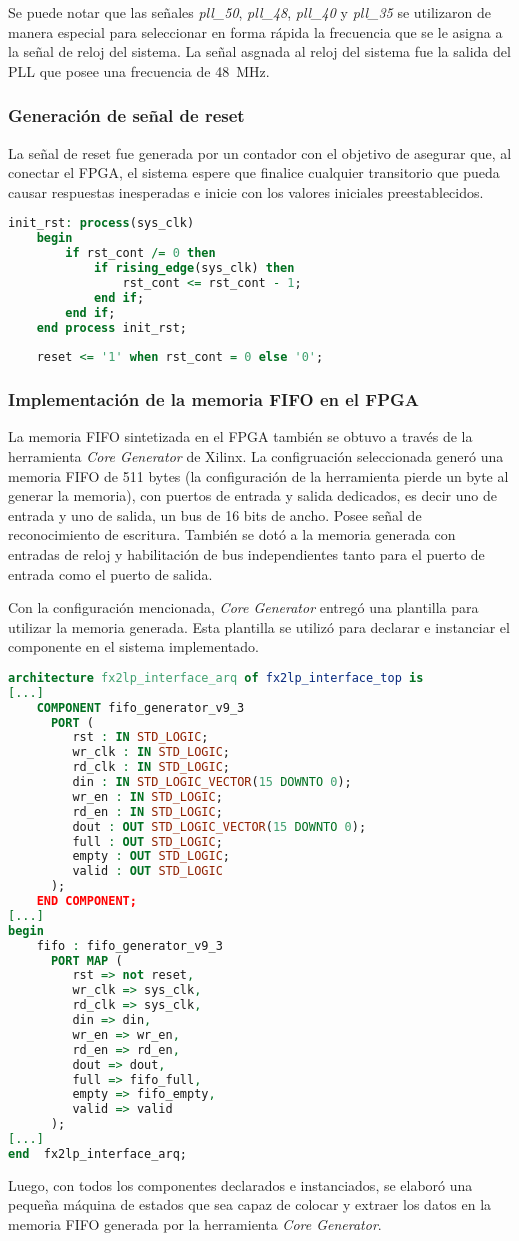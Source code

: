 		Se puede notar que las señales {\it pll\_50}, {\it pll\_48}, {\it pll\_40} y {\it pll\_35} se utilizaron de manera especial para seleccionar en forma rápida la frecuencia que se le asigna a la señal de reloj del sistema. La señal asgnada al reloj del sistema fue la salida del PLL que posee una frecuencia de \SI{48}{\mega\hertz}.
		
	\subsubsection{Generación de señal de reset}
		La señal de reset fue generada por un contador con el objetivo de asegurar que, al conectar el FPGA, el sistema espere que finalice cualquier transitorio que pueda causar respuestas inesperadas e inicie con los valores iniciales preestablecidos.

		\begin{lstlisting}[language=VHDL,backgroundcolor=\color{gray!30}]
	init_rst: process(sys_clk)
	begin
		if rst_cont /= 0 then
			if rising_edge(sys_clk) then
				rst_cont <= rst_cont - 1;
			end if;
		end if;
	end process init_rst;
	
	reset <= '1' when rst_cont = 0 else '0';
		\end{lstlisting}
		
	\subsubsection{Implementación de la memoria FIFO en el FPGA}
		La memoria FIFO sintetizada en el FPGA también se obtuvo a través de la herramienta {\it Core Generator} de Xilinx. La configruación seleccionada generó una memoria FIFO de 511 bytes (la configuración de la herramienta pierde un byte al generar la memoria), con puertos de entrada y salida dedicados, es decir uno de entrada y uno de salida, un bus de 16 bits de ancho. Posee señal de reconocimiento de escritura. También se dotó a la memoria generada con entradas de reloj y habilitación de bus independientes tanto para el puerto de entrada como el puerto de salida.
		
		Con la configuración mencionada, {\it Core Generator} entregó una plantilla para utilizar la memoria generada. Esta plantilla se utilizó para declarar e instanciar el componente en el sistema implementado. 
		
		\begin{lstlisting}[language=VHDL,backgroundcolor=\color{gray!30}]
architecture fx2lp_interface_arq of fx2lp_interface_top is
[...]
	COMPONENT fifo_generator_v9_3
	  PORT (
		 rst : IN STD_LOGIC;
		 wr_clk : IN STD_LOGIC;
		 rd_clk : IN STD_LOGIC;
		 din : IN STD_LOGIC_VECTOR(15 DOWNTO 0);
		 wr_en : IN STD_LOGIC;
		 rd_en : IN STD_LOGIC;
		 dout : OUT STD_LOGIC_VECTOR(15 DOWNTO 0);
		 full : OUT STD_LOGIC;
		 empty : OUT STD_LOGIC;
		 valid : OUT STD_LOGIC
	  );
	END COMPONENT;
[...]
begin
	fifo : fifo_generator_v9_3
	  PORT MAP (
		 rst => not reset,
		 wr_clk => sys_clk,
		 rd_clk => sys_clk,
		 din => din,
		 wr_en => wr_en,
		 rd_en => rd_en,
		 dout => dout,
		 full => fifo_full,
		 empty => fifo_empty,
		 valid => valid
	  );
[...]
end  fx2lp_interface_arq;
		\end{lstlisting}
		
		Luego, con todos los componentes declarados e instanciados, se elaboró una pequeña máquina de estados que sea capaz de colocar y extraer los datos en la memoria FIFO generada por la herramienta \textit{Core Generator}.